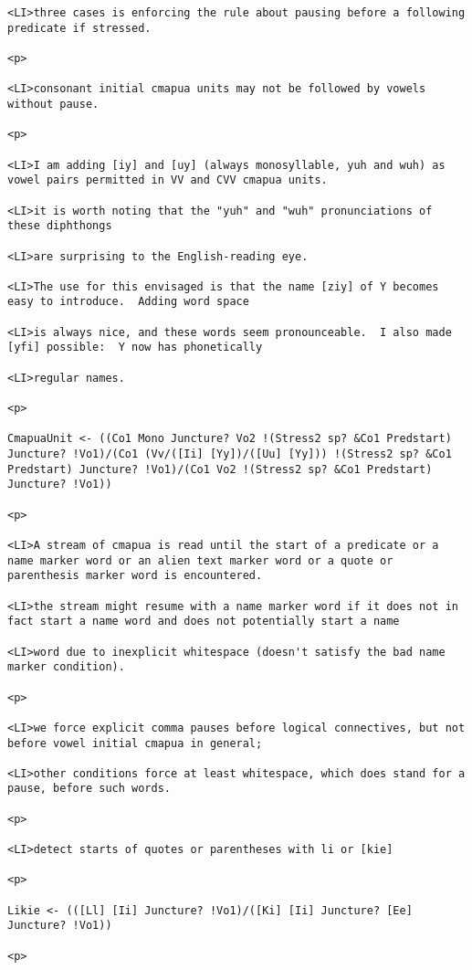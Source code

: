 \documentclass[12pt]{article}
\begin{document}
\begin{lstlisting}
<LI>three cases is enforcing the rule about pausing before a following predicate if stressed.

<p>

<LI>consonant initial cmapua units may not be followed by vowels without pause.

<p>

<LI>I am adding [iy] and [uy] (always monosyllable, yuh and wuh) as vowel pairs permitted in VV and CVV cmapua units.

<LI>it is worth noting that the "yuh" and "wuh" pronunciations of these diphthongs

<LI>are surprising to the English-reading eye.

<LI>The use for this envisaged is that the name [ziy] of Y becomes easy to introduce.  Adding word space

<LI>is always nice, and these words seem pronounceable.  I also made [yfi] possible:  Y now has phonetically

<LI>regular names.

<p>

CmapuaUnit <- ((Co1 Mono Juncture? Vo2 !(Stress2 sp? &Co1 Predstart) Juncture? !Vo1)/(Co1 (Vv/([Ii] [Yy])/([Uu] [Yy])) !(Stress2 sp? &Co1 Predstart) Juncture? !Vo1)/(Co1 Vo2 !(Stress2 sp? &Co1 Predstart) Juncture? !Vo1))

<p>

<LI>A stream of cmapua is read until the start of a predicate or a name marker word or an alien text marker word or a quote or parenthesis marker word is encountered.

<LI>the stream might resume with a name marker word if it does not in fact start a name word and does not potentially start a name

<LI>word due to inexplicit whitespace (doesn't satisfy the bad name marker condition).

<p>

<LI>we force explicit comma pauses before logical connectives, but not before vowel initial cmapua in general;

<LI>other conditions force at least whitespace, which does stand for a pause, before such words.

<p>

<LI>detect starts of quotes or parentheses with li or [kie]

<p>

Likie <- (([Ll] [Ii] Juncture? !Vo1)/([Ki] [Ii] Juncture? [Ee] Juncture? !Vo1))

<p>


\end{lstlisting}
\end{document}
